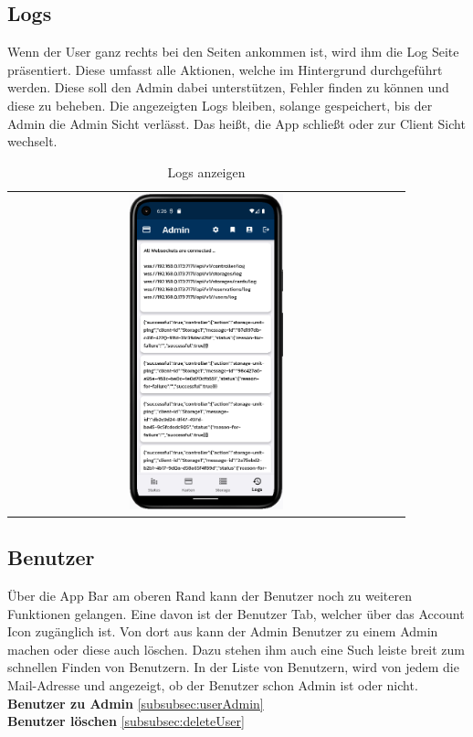 \newpage

\subsection{Logs}
Wenn der User ganz rechts bei den Seiten ankommen ist, wird ihm die Log Seite präsentiert. Diese umfasst alle Aktionen, welche im Hintergrund durchgeführt werden. Diese soll den Admin dabei unterstützen, Fehler finden zu können und diese zu beheben. Die angezeigten Logs bleiben, solange gespeichert, bis der Admin die Admin Sicht verlässt. Das heißt, die App schließt oder zur Client Sicht wechselt.

\vspace{1cm}
\begin{table}[htbp]
  \centering
  \begin{tabular}{c}
    \includegraphics[width=0.4\textwidth]{FLUTTER/images/ZB/logs_page.png} 
  \end{tabular}
  \label{tab:example}
  \captionsetup{type=figure}
  \caption{Logs anzeigen}
\end{table}

\newpage

\subsection{Benutzer}
Über die App Bar am oberen Rand kann der Benutzer noch zu weiteren Funktionen gelangen. Eine davon ist der Benutzer Tab, welcher über das Account Icon zugänglich ist. Von dort aus kann der Admin Benutzer zu einem Admin machen oder diese auch löschen. Dazu stehen ihm auch eine Such leiste breit zum schnellen Finden von Benutzern. In der Liste von Benutzern, wird von jedem die Mail-Adresse und angezeigt, ob der Benutzer schon Admin ist oder nicht.
\vspace{5cm}
\\
\vspace{5cm}
\textbf{Benutzer zu Admin} \ref{subsubsec:userAdmin}
\\
\vspace{5cm}
\textbf{Benutzer löschen} \ref{subsubsec:deleteUser}

